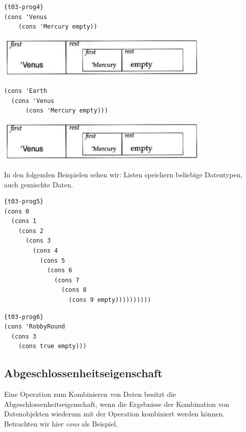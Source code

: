 \begin{lstlisting}{t03-prog4}
(cons 'Venus
    (cons 'Mercury empty))
\end{lstlisting}
\includegraphics[height=2cm]{Bilder/T03_01.png}

\begin{lstlisting}
(cons 'Earth
  (cons 'Venus
	  (cons 'Mercury empty)))
\end{lstlisting}
\includegraphics[height=2cm]{Bilder/T03_01.png}

In den folgenden Beispielen sehen wir: Listen speichern beliebige Datentypen, auch gemischte Daten.

\begin{lstlisting}{t03-prog5}
(cons 0
  (cons 1
    (cons 2
      (cons 3
        (cons 4
      	  (cons 5
            (cons 6
              (cons 7
                (cons 8
                  (cons 9 empty))))))))))
\end{lstlisting}

\begin{lstlisting}{t03-prog6}
(cons 'RobbyRound
  (cons 3
    (cons true empty)))
\end{lstlisting}
\subsection{Abgeschlossenheitseigenschaft}
Eine Operation zum Kombinieren von Daten besitzt die Abgeschlossenheitseigenschaft, wenn die Ergebnisse der Kombination von Datenobjekten wiederum mit der Operation kombiniert werden können. Betrachten wir hier \textit{cons} als Beispiel.
